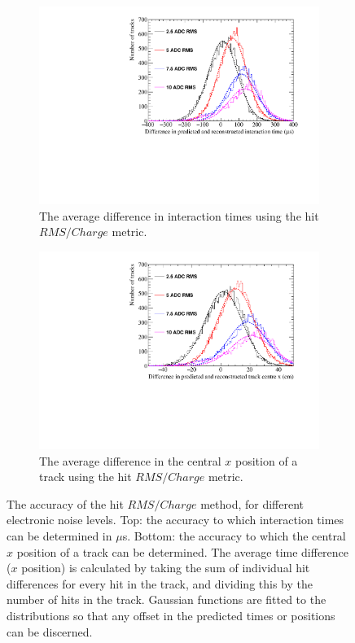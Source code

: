 \begin{figure}
  \centering
  \begin{subfigure}{0.6\textwidth}
    \centering
    \includegraphics[width=\textwidth]{Canvas_AvDiff_T_RMS_Q_NoiseLevel}
    \caption{The average difference in interaction times using the hit $RMS/Charge$ metric.}
    \label{fig:DiffNoiseStudy_AvDiff_RMS_Int_T}
  \end{subfigure}
  \begin{subfigure}{0.6\textwidth}
    \centering
    \includegraphics[width=\textwidth]{Canvas_AvDiff_X_RMS_Q_NoiseLevel}
    \caption{The average difference in the central $x$ position of a track using the hit $RMS/Charge$ metric.}
    \label{fig:DiffNoiseStudy_AvDiff_RMS_Int_X}
  \end{subfigure}
  \caption[Comparing the accuracy of the hit $RMS$ method, as the electronic noise level changes]
          {The accuracy of the hit $RMS/Charge$ method, for different electronic noise levels. Top: the accuracy to which interaction times can be determined in $\mu$s. Bottom: the accuracy to which the central $x$ position of a track can be determined. The average time difference ($x$ position) is calculated by taking the sum of individual hit differences for every hit in the track, and dividing this by the number of hits in the track. Gaussian functions are fitted to the distributions so that any offset in the predicted times or positions can be discerned.}
  \label{fig:DiffNoiseStudy_AvDiff_RMS_Int}
\end{figure}

